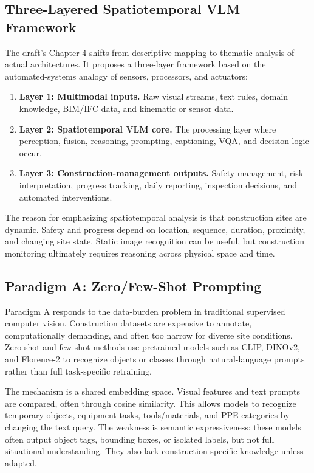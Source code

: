 \documentclass[10pt,letterpaper]{article}
\begin{document}
\subsection{Three-Layered Spatiotemporal VLM Framework}

The draft's Chapter 4 shifts from descriptive mapping to thematic analysis of actual architectures. It proposes a three-layer framework based on the automated-systems analogy of sensors, processors, and actuators:

\begin{enumerate}
\item \textbf{Layer 1: Multimodal inputs.} Raw visual streams, text rules, domain knowledge, BIM/IFC data, and kinematic or sensor data.
\item \textbf{Layer 2: Spatiotemporal VLM core.} The processing layer where perception, fusion, reasoning, prompting, captioning, VQA, and decision logic occur.
\item \textbf{Layer 3: Construction-management outputs.} Safety management, risk interpretation, progress tracking, daily reporting, inspection decisions, and automated interventions.
\end{enumerate}

The reason for emphasizing spatiotemporal analysis is that construction sites are dynamic. Safety and progress depend on location, sequence, duration, proximity, and changing site state. Static image recognition can be useful, but construction monitoring ultimately requires reasoning across physical space and time.

\subsection{Paradigm A: Zero/Few-Shot Prompting}

Paradigm A responds to the data-burden problem in traditional supervised computer vision. Construction datasets are expensive to annotate, computationally demanding, and often too narrow for diverse site conditions. Zero-shot and few-shot methods use pretrained models such as CLIP, DINOv2, and Florence-2 to recognize objects or classes through natural-language prompts rather than full task-specific retraining.

The mechanism is a shared embedding space. Visual features and text prompts are compared, often through cosine similarity. This allows models to recognize temporary objects, equipment tasks, tools/materials, and PPE categories by changing the text query. The weakness is semantic expressiveness: these models often output object tags, bounding boxes, or isolated labels, but not full situational understanding. They also lack construction-specific knowledge unless adapted.
\end{document}
